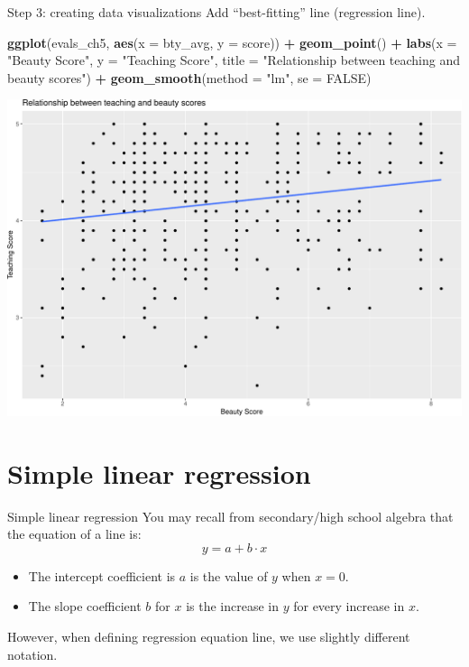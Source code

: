 \documentclass[
  ignorenonframetext,
]{beamer}
\newenvironment{Shaded}{\begin{snugshade}}{\end{snugshade}}
\newcommand{\AttributeTok}[1]{\textcolor[rgb]{0.13,0.29,0.53}{#1}}
\newcommand{\ConstantTok}[1]{\textcolor[rgb]{0.56,0.35,0.01}{#1}}
\newcommand{\FunctionTok}[1]{\textcolor[rgb]{0.13,0.29,0.53}{\textbf{#1}}}
\newcommand{\NormalTok}[1]{#1}
\newcommand{\SpecialCharTok}[1]{\textcolor[rgb]{0.81,0.36,0.00}{\textbf{#1}}}
\newcommand{\StringTok}[1]{\textcolor[rgb]{0.31,0.60,0.02}{#1}}
\begin{document}
\begin{frame}[fragile]{Step 3: creating data visualizations}
\protect\hypertarget{step-3-creating-data-visualizations-1}{}
Add ``best-fitting'' line (regression line).

\tiny

\begin{Shaded}
\begin{Highlighting}[]
\FunctionTok{ggplot}\NormalTok{(evals\_ch5, }\FunctionTok{aes}\NormalTok{(}\AttributeTok{x =}\NormalTok{ bty\_avg, }\AttributeTok{y =}\NormalTok{ score)) }\SpecialCharTok{+}
  \FunctionTok{geom\_point}\NormalTok{() }\SpecialCharTok{+}
  \FunctionTok{labs}\NormalTok{(}\AttributeTok{x =} \StringTok{"Beauty Score"}\NormalTok{, }\AttributeTok{y =} \StringTok{"Teaching Score"}\NormalTok{,}
       \AttributeTok{title =} \StringTok{"Relationship between teaching and beauty scores"}\NormalTok{) }\SpecialCharTok{+}  
  \FunctionTok{geom\_smooth}\NormalTok{(}\AttributeTok{method =} \StringTok{"lm"}\NormalTok{, }\AttributeTok{se =} \ConstantTok{FALSE}\NormalTok{)}
\end{Highlighting}
\end{Shaded}

\begin{center}\includegraphics[width=0.5\linewidth,height=0.5\textheight]{Week4_files/figure-beamer/unnamed-chunk-18-1} \end{center}
\normalsize
\end{frame}

\hypertarget{simple-linear-regression}{%
\section{Simple linear regression}\label{simple-linear-regression}}

\begin{frame}{Simple linear regression}
\protect\hypertarget{simple-linear-regression-1}{}
You may recall from secondary/high school algebra that the equation of a
line is: \[y=a+b\cdot x\]

\begin{itemize}
\item
  The intercept coefficient is \(a\) is the value of \(y\) when \(x=0\).
\item
  The slope coefficient \(b\) for \(x\) is the increase in \(y\) for
  every increase in \(x\).
\end{itemize}

However, when defining regression equation line, we use slightly
different notation.
\end{frame}
\end{document}
